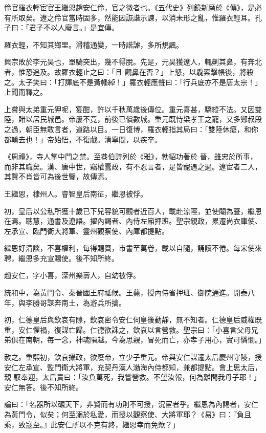 
\begin{pinyinscope}

 伶官羅衣輕宦官王繼恩趙安仁伶，官之微者也。《五代史》列鏡新磨於《傳》，是必有所取矣。遼之伶官當時固多，然能因詼諧示諫，以消未形之亂，惟羅衣輕耳。孔子曰：「君子不以人廢言。」是宜傳。



 羅衣輕，不知其鄉里。滑稽通變，一時諧謔，多所規諷。



 興宗敗於李元昊也，單騎突出，幾不得脫。先是，元昊獲遼人，輒劓其鼻，有奔北者，惟恐追及。故羅衣輕止之曰：「且
 觀鼻在否？」上怒，以毳索擊帳後，將殺之。太子笑曰：「打諢底不是黃幡綽！」羅衣輕應聲曰：「行兵底亦不是唐太宗！」上聞而釋之。



 上嘗與太弟重元狎呢，宴酣，許以千秋萬歲後傳位。重元喜甚，驕縱不法。又因雙陸，賭以居民城邑。帝屢不竟，前後已償數城。重元既恃梁孝王之寵，又多鄭叔段之過，朝臣無敢言者，道路以目。一日復博，羅衣輕指其局曰：「雙陸休癡，和你都輸去也！」帝始悟，不復戲。清寧間，以疾卒。



 《周禮》，寺人掌中門之禁。至巷伯詩列於《雅》，勃貂功著於
 晉，雖忠於所事，而非其職矣。漢、唐中世，竊權蠹政，有不忍言者，是皆寵遇之過。遼宦者二人，其賢不肖皆可為後世鑒，故傳焉。



 王繼恩，棣州人。睿智皇后南征，繼恩被俘。



 初，皇后以公私所獲十歲已下兒容貌可觀者近百人，載赴涼陘，並使閹為豎，繼恩在焉。聰慧，通書及遼語。擢內謁者、內侍左廂押班。聖宗親政，累遷尚衣庫使、左承宣、臨門衛大將軍、靈州觀察使、內庫都提點。



 繼恩好清談，不喜權利，每得賜賚，市書至萬卷，載以自隨，誦讀不倦。每宋使來聘，繼恩多充宣賜使。後不知所終。



 趙安仁，字小喜，深州樂壽人，自幼被俘。



 統和中，為黃門令、秦晉國王府祗候。王薨，授內侍省押班、御院通進。開泰八年，與李勝哥謀奔南土，為游兵所擒。



 初，仁德皇后與欽哀有隙，欽哀密令安仁伺皇後動靜，無不知者。仁德皇后威權既重，安仁懼禍，復謀亡歸。仁德欲誅之，欽哀以言營救。聖宗曰：「小喜言父母兄弟俱在南朝，每一念，神魂隕越。今為思親，冒死而亡，亦孝子用心，實可憐憫。」



 赦之。重熙初，欽哀攝政，欲廢帝，立少子重元。帝與安仁謀遷太后慶州守陵，授安仁左承宣、監門衛大將軍，充契丹漢人渤海內侍都知，兼都提點。會上思太后，親
 馭奉迎，太后責曰：「汝負萬死，我嘗營救。不望汝報，何為離間我母子耶！」安仁無答。後不知所終。



 論曰：「名器所以礪天下，非賢而有功則不可授，況宦者乎。繼恩為內謁者，安仁為黃門令，似矣；何至溺於私愛，而授以觀察使、大將軍耶？《易》曰：『負且乘，致寇至。』此安仁所以不克有終，繼恩幸而免歟？」



\end{pinyinscope}